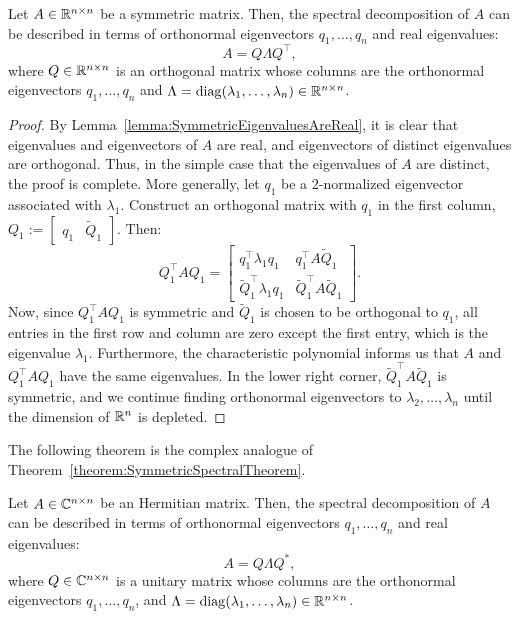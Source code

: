 \begin{theorem}\label{theorem:SymmetricSpectralTheorem}
Let $A\in\mathbb{R}^{n\times n}$ be a symmetric matrix. Then, the spectral decomposition of $A$ can be described in terms of orthonormal eigenvectors $q_1,\ldots,q_n$ and real eigenvalues:
\[
A = Q\Lambda Q^\top,
\]
where $Q\in\mathbb{R}^{n\times n}$ is an orthogonal matrix whose columns are the orthonormal eigenvectors $q_1,\ldots,q_n$ and $\Lambda = \operatorname{diag}(\lambda_1,\ldots,\lambda_n)\in\mathbb{R}^{n\times n}$.
\end{theorem}
\begin{proof}
By Lemma~\ref{lemma:SymmetricEigenvaluesAreReal}, it is clear that eigenvalues and eigenvectors of $A$ are real, and eigenvectors of distinct eigenvalues are orthogonal. Thus, in the simple case that the eigenvalues of $A$ are distinct, the proof is complete. More generally, let $q_1$ be a $2$-normalized eigenvector associated with $\lambda_1$. Construct an orthogonal matrix with $q_1$ in the first column, $Q_1 := \begin{bmatrix} q_1 & \tilde{Q}_1\end{bmatrix}$. Then:
\[
Q_1^\top A Q_1 = \begin{bmatrix} q_1^\top \lambda_1 q_1 & q_1^\top A\tilde{Q}_1\\ \tilde{Q}_1^\top\lambda_1 q_1 & \tilde{Q}_1^\top A \tilde{Q}_1 \end{bmatrix}.
\]
Now, since $Q_1^\top A Q_1$ is symmetric and $\tilde{Q}_1$ is chosen to be orthogonal to $q_1$, all entries in the first row and column are zero except the first entry, which is the eigenvalue $\lambda_1$. Furthermore, the characteristic polynomial informs us that $A$ and $Q_1^\top A Q_1$ have the same eigenvalues. In the lower right corner, $\tilde{Q}_1^\top A\tilde{Q}_1$ is symmetric, and we continue finding orthonormal eigenvectors to $\lambda_2,\ldots,\lambda_n$ until the dimension of $\mathbb{R}^n$ is depleted.
\end{proof}

The following theorem is the complex analogue of Theorem~\ref{theorem:SymmetricSpectralTheorem}.

\begin{theorem}\label{theorem:HermitianSpectralTheorem}
Let $A\in\mathbb{C}^{n\times n}$ be an Hermitian matrix. Then, the spectral decomposition of $A$ can be described in terms of orthonormal eigenvectors $q_1,\ldots,q_n$ and real eigenvalues:
\[
A = Q\Lambda Q^*,
\]
where $Q\in\mathbb{C}^{n\times n}$ is a unitary matrix whose columns are the orthonormal eigenvectors $q_1,\ldots,q_n$, and $\Lambda = \operatorname{diag}(\lambda_1,\ldots,\lambda_n)\in\mathbb{R}^{n\times n}$.
\end{theorem}

